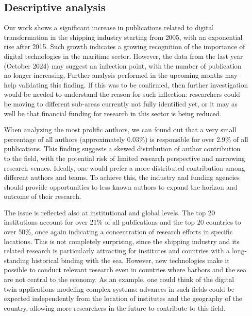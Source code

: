 \documentclass[jmse,review,submit,pdftex,moreauthors]{Definitions/mdpi}
\begin{document}
\subsection{Descriptive analysis}	
Our work shows a significant increase in publications related to digital transformation in the shipping industry starting from 2005, with an exponential rise after 2015. Such growth indicates a growing recognition of the importance of digital technologies in the maritime sector. However, the data from the last year (October 2024) may suggest an inflection point, with the number of publication no longer increasing. Further analysis performed in the upcoming months may help validating this finding. If this was to be confirmed, then further investigation would be needed to understand the reason for such inflection: researchers could be moving to different sub-areas currently not fully identified yet, or it may as well be that financial funding for research in this sector is being reduced.

When analyzing the most prolific authors, we can found out that a very small percentage of all authors (approximately 0.03\%) is responsible for over 2.9\% of all publications. This finding suggests a skewed distribution of author contribution to the field, with the potential risk of limited research perspective and narrowing research venues. Ideally, one would prefer a more distributed contribution among different authors and teams. To achieve this, the industry and funding agencies should provide opportunities to less known authors to expand the horizon and outcome of their research.

The issue is reflected also at institutional and global levels. The top 20 institutions account for over 21\% of all publications and the top 20 countries to over 50\%, once again indicating a concentration of research efforts in specific locations. This is not completely surprising, since the shipping industry and its related research is particularly attracting for institutes and countries with a long-standing historical binding with the sea. However, new technologies make it possible to conduct relevant research even in countries where harbors and the sea are not central to the economy. As an example, one could think of the digital twin applications modeling complex systems: advances in such fields could be expected independently from the location of institutes and the geography of the country, allowing more researchers in the future to contribute to this field.
\end{document}
